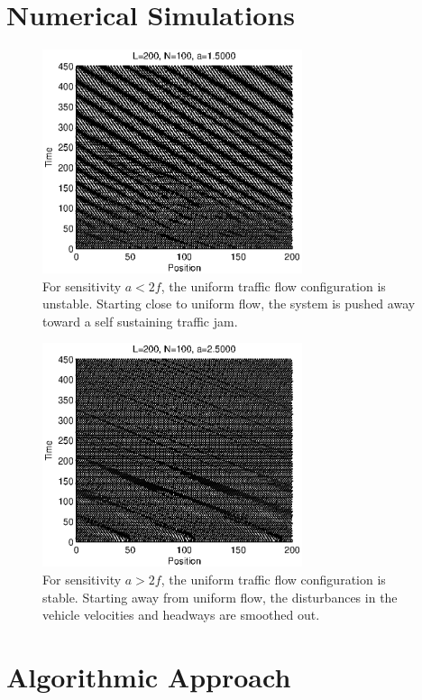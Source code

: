 \documentclass[10pt,twocolumn]{article}
\newcommand{\lm}{\fontfamily{\sfdefault}\selectfont}
\begin{document}
\section{Numerical Simulations}

\begin{figure}[!h]
\lm
\begin{center}
\includegraphics[width=3in]{instability}
\end{center}
\caption{ \label{fig:instability} For sensitivity $a<2f$, the uniform traffic flow configuration is unstable. Starting close to uniform flow, the system is pushed away toward a self sustaining traffic jam.}
\end{figure}


\begin{figure}[!h]
\lm
\begin{center}
\includegraphics[width=3in]{smoothed}
\end{center}
\caption{ \label{fig:smoothed} For sensitivity $a>2f$, the uniform traffic flow configuration is stable. Starting away from uniform flow, the disturbances in the vehicle velocities and headways are smoothed out.}
\end{figure}

\section{Algorithmic Approach}
\end{document}

